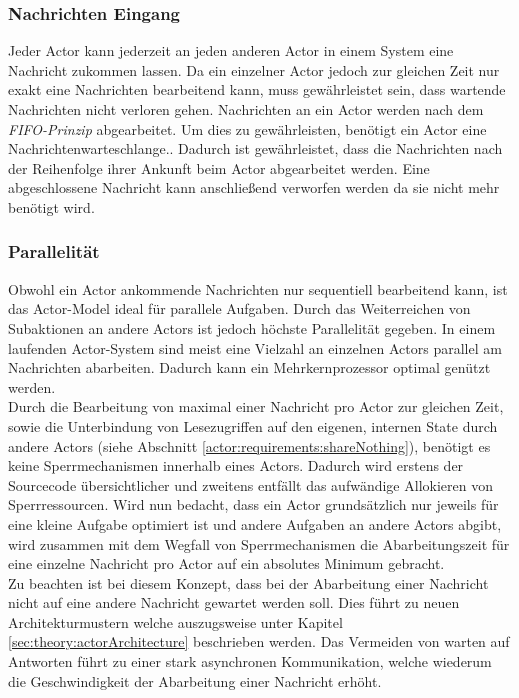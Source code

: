 \subsubsection{Nachrichten Eingang}\label{actor:Mailbox}
Jeder Actor kann jederzeit an jeden anderen Actor in einem System eine Nachricht zukommen lassen. Da ein einzelner Actor jedoch zur gleichen Zeit nur exakt eine Nachrichten bearbeitend kann, muss gewährleistet sein, dass wartende Nachrichten nicht verloren gehen. Nachrichten an ein Actor werden nach dem \textit{FIFO-Prinzip} abgearbeitet. 
 Um dies zu gewährleisten, benötigt ein Actor eine Nachrichtenwarteschlange.\citep{Agha1985ActorsSystems}.  Dadurch ist gewährleistet, dass die Nachrichten nach der Reihenfolge ihrer Ankunft beim Actor abgearbeitet werden. Eine abgeschlossene Nachricht kann anschließend verworfen werden da sie nicht mehr benötigt wird. 

\subsubsection{Parallelität}\label{actor:parallelism}
Obwohl ein Actor ankommende Nachrichten nur sequentiell bearbeitend kann, ist das Actor-Model ideal für parallele Aufgaben.\citep{hewitt1973session} Durch das Weiterreichen von Subaktionen an andere Actors ist jedoch höchste Parallelität gegeben. In einem laufenden Actor-System sind meist eine Vielzahl an einzelnen Actors parallel am Nachrichten abarbeiten. Dadurch kann ein Mehrkernprozessor optimal genützt werden. \citep{Agha1985ActorsSystems} \\  
Durch die Bearbeitung von maximal einer Nachricht pro Actor zur gleichen Zeit, sowie die Unterbindung von Lesezugriffen auf den eigenen, internen State durch andere Actors (siehe Abschnitt \ref{actor:requirements:shareNothing}), benötigt es keine Sperrmechanismen innerhalb eines Actors. Dadurch wird erstens der Sourcecode übersichtlicher und zweitens entfällt das aufwändige Allokieren von Sperrressourcen.\citep{Vernon2015ReactiveAkka}
Wird nun bedacht, dass ein Actor grundsätzlich nur jeweils für eine kleine Aufgabe optimiert ist und andere Aufgaben an andere Actors abgibt, wird zusammen mit dem Wegfall von Sperrmechanismen die Abarbeitungszeit für eine einzelne Nachricht pro Actor auf ein absolutes Minimum gebracht. \citep{Vernon2015ReactiveAkka} \\
Zu beachten ist bei diesem Konzept, dass bei der Abarbeitung einer Nachricht nicht auf eine andere Nachricht gewartet werden soll. Dies führt zu neuen Architekturmustern welche auszugsweise unter Kapitel \ref{sec:theory:actorArchitecture} beschrieben werden. Das Vermeiden von warten auf Antworten führt zu einer stark asynchronen Kommunikation, welche wiederum die Geschwindigkeit der Abarbeitung einer Nachricht erhöht.

